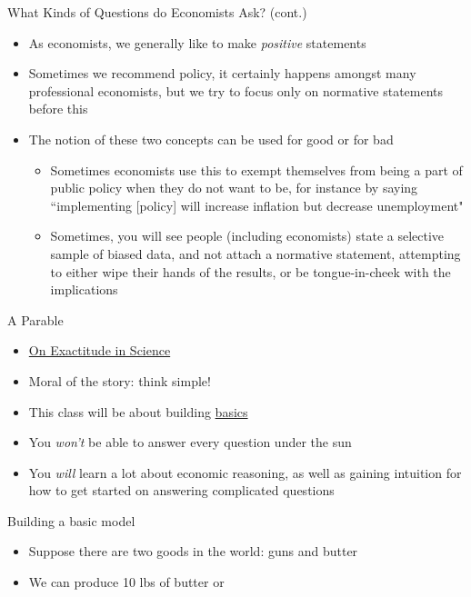\documentclass[10pt,xcolor={svgnames}]{beamer}
\begin{document}
\begin{frame}{What Kinds of Questions do Economists Ask? (cont.)}
    \begin{itemize}[<+->]
        \item As economists, we generally like to make \textit{positive} statements
        \item Sometimes we recommend policy, it certainly happens amongst many professional economists, but we try to focus only on normative statements before this
        \item The notion of these two concepts can be used for good or for bad
        \begin{itemize}[<+->]
            \item Sometimes economists use this to exempt themselves from being a part of public policy when they do not want to be, for instance by saying ``implementing [policy] will increase inflation but decrease unemployment"
            \item Sometimes, you will see people (including economists)  state a selective sample of biased data, and not attach a normative statement, attempting to either wipe their hands of the results, or be tongue-in-cheek with the implications
        \end{itemize}
    \end{itemize}
\end{frame}

\begin{frame}{A Parable}
\begin{itemize}[<+->]
    \item \href{http://www.mi.sanu.ac.rs/~kosta/O\%20strogosti\%20u\%20nauci.pdf}{On Exactitude in Science}
    \item Moral of the story: think simple!
    \item This class will be about building \underline{basics}
    \item You \textit{won't} be able to answer every question under the sun
    \item You \textit{will} learn a lot about economic reasoning, as well as gaining intuition for how to get started on answering complicated questions
\end{itemize}
\end{frame}

\begin{frame}{Building a basic model}
    \begin{itemize}
        \item Suppose there are two goods in the world: guns and butter
        \item We can produce 10 lbs of butter or 
    \end{itemize}
\end{frame}
\end{document}
